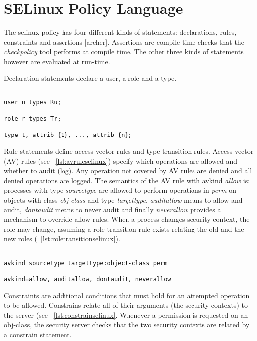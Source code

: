 \section{SELinux Policy Language}

The \ac{selinux} policy has four different kinds of statements: declarations, rules, constraints and assertions [archer]. Assertions are compile time checks that the \emph{checkpolicy} tool performs at compile time. The other three kinds of statements however are evaluated at run-time. 

Declaration statements declare a user, a role and a type. 

\lstset{language=selinux}
\begin{lstlisting}[frame=single, caption={Declarations},label={lst:declsselinux}]

user u types Ru;

role r types Tr;

type t, attrib_{1}, ..., attrib_{n};

\end{lstlisting}

Rule statements define access vector rules and type transition rules. Access vector (AV) rules (see ~\ref{lst:avruleselinux}) specify which operations are allowed and whether to audit (log). Any operation not covered by AV rules are denied and all denied operations are logged. The semantics of the AV rule with avkind \emph{allow} is: processes with type \emph{sourcetype} are allowed to perform operations in \emph{perm} on objects with class \emph{obj-class} and type \emph{targettype}. \emph{auditallow} means to allow and audit, \emph{dontaudit} means to never audit and finally \emph{neverallow} provides a mechanism to override allow rules. When a process changes security context, the role may change, assuming a role transition rule exists relating the old and the new roles (~\ref{lst:roletransitionselinux}).

\lstset{language=selinux}
\begin{lstlisting}[frame=single, caption={AV rule},label={lst:avruleselinux}]

avkind sourcetype targettype:object-class perm

avkind=allow, auditallow, dontaudit, neverallow
\end{lstlisting}

Constraints are additional conditions that must hold for an attempted operation to be allowed. Constrains relate all of their arguments (the security contexts) to the server (see ~\ref{lst:constrainselinux}. Whenever a permission is requested on an obj-class, the security server checks that the two security contexts are related by a constrain statement.

